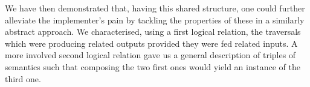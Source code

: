 We have then demonstrated that, having this shared structure, one could
further alleviate the implementer's pain by tackling the properties of
these  in a similarly abstract approach. We characterised,
using a first logical relation, the traversals which were producing
related outputs provided they were fed related inputs. A more involved
second logical relation gave us a general description of triples of
 semantics such that composing the two first ones would
yield an instance of the third one.
